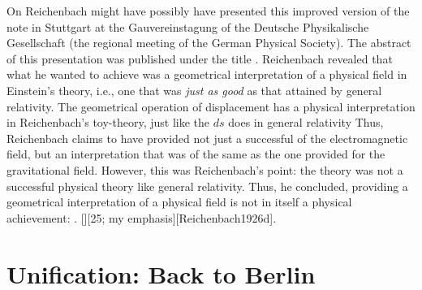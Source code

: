 \documentclass[draft]{article}
\begin{document}
On  Reichenbach might have possibly have presented this improved version of the note in Stuttgart at the Gauvereinstagung of the Deutsche Physikalische Gesellschaft (the regional meeting of the German Physical Society). The abstract of this presentation was published under the title  \citep{Reichenbach1926d}. Reichenbach revealed that what he wanted to achieve was a geometrical interpretation of a physical field  in Einstein's theory, i.e., one that was \emph{just as good} as that attained by general relativity. The geometrical operation of displacement has a physical interpretation in Reichenbach's toy-theory, just like the $d s$ does in general relativity Thus, Reichenbach claims to have provided not just a successful  of the electromagnetic field, but an interpretation that was of the same  as the one \gr provided for the gravitational field. However, this was Reichenbach's point: the theory was not a successful physical theory like general relativity. Thus, he concluded, providing a geometrical interpretation of a physical field is not in itself a physical achievement: . [][25; my emphasis][Reichenbach1926d].





\section{Unification: Back to Berlin}
\end{document}

